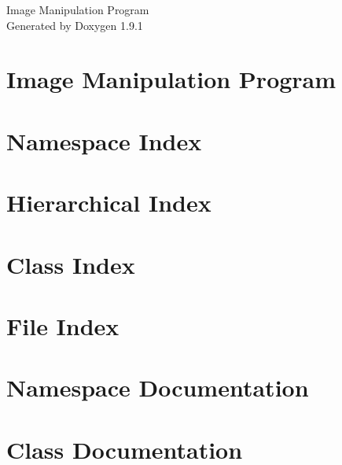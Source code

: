 \let\mypdfximage\pdfximage\def\pdfximage{\immediate\mypdfximage}\documentclass[twoside]{book}
\newcommand{\+}{\discretionary{\mbox{\scriptsize$\hookleftarrow$}}{}{}}
\newcommand{\clearemptydoublepage}{%
  \newpage{\pagestyle{empty}\cleardoublepage}%
}
\begin{document}
\raggedbottom

\hypersetup{pageanchor=false,
             bookmarksnumbered=true,
             pdfencoding=unicode
            }
\begin{titlepage}
\vspace*{7cm}
\begin{center}%
{\Large Image Manipulation Program }\\
\vspace*{1cm}
{\large Generated by Doxygen 1.9.1}\\
\end{center}
\end{titlepage}
\clearemptydoublepage
{}
\tableofcontents
\clearemptydoublepage
{}
\hypersetup{pageanchor=true}

\chapter{Image Manipulation Program}
\label{index}\hypertarget{index}{}
\chapter{Namespace Index}

\chapter{Hierarchical Index}

\chapter{Class Index}

\chapter{File Index}

\chapter{Namespace Documentation}


\chapter{Class Documentation}


























\end{document}
